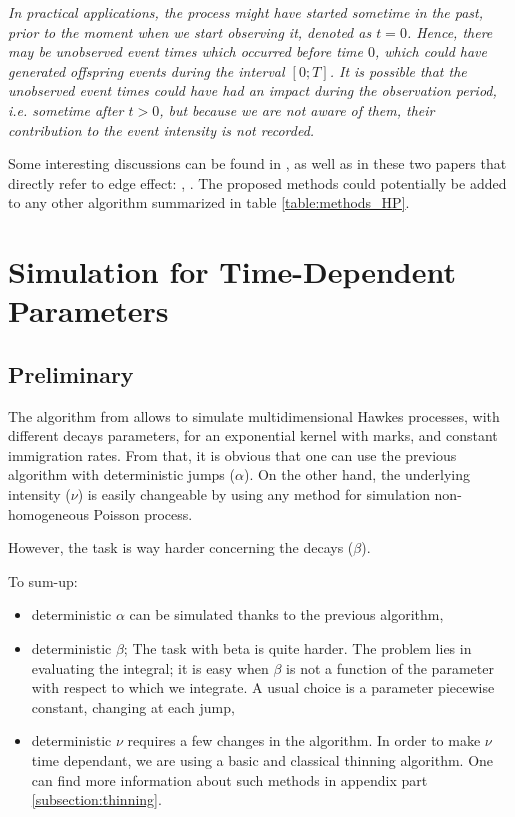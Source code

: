 \textit{In practical applications, the process might have started sometime in the past, prior to the moment when we start observing it, denoted as $t = 0$. Hence, there may be unobserved event times which occurred before time $0$, which could have generated offspring events during the interval $[0;T]$. It is possible that the unobserved event times could have had an impact during the observation period, i.e. sometime after $t > 0$, but because we are not aware of them, their contribution to the event intensity is not recorded.}


Some interesting discussions can be found in \cite{daley}, as well as in these two papers that directly refer to edge effect: \cite{cox}, \cite{rasmussen}. The proposed methods could potentially be added to any other algorithm summarized in table \ref{table:methods_HP}.




\section{Simulation for Time-Dependent Parameters}
\subsection{Preliminary}

The algorithm from \cite{my_algo_simul} allows to simulate multidimensional Hawkes processes, with different decays parameters, for an exponential kernel with marks, and constant immigration rates. From that, it is obvious that one can use the previous algorithm with deterministic jumps ($\alpha$). On the other hand, the underlying intensity ($\nu$) is easily changeable by using any method for simulation non-homogeneous Poisson process.

However, the task is way harder concerning the decays ($\beta$).

To sum-up:
\begin{itemize}
\item deterministic $\alpha$ can be simulated thanks to the previous algorithm,
\item deterministic $\beta$; The task with beta is quite harder. The problem lies in evaluating the integral; it is easy when $\beta$ is not a function of the parameter with respect to which we integrate. A usual choice is a parameter piecewise constant, changing at each jump, 
\item deterministic $\nu$ requires a few changes in the algorithm. In order to make $\nu$ time dependant, we are using a basic and classical thinning algorithm. One can find more information about such methods in appendix part \ref{subsection:thinning}.
\end{itemize}





